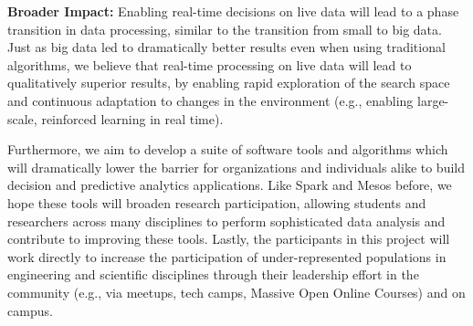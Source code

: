 \documentclass [10pt]{article}
\begin{document}
{%

{\bf Broader Impact:} Enabling real-time decisions on live data will lead to a phase transition in data processing, similar to the transition from small to big data. Just as big data led to dramatically better results even when using traditional algorithms, 
we believe that real-time processing on live data will lead to qualitatively superior results, by enabling rapid exploration of the search space and continuous adaptation to changes in the environment (e.g., enabling large-scale, reinforced learning in real time).

Furthermore, we aim to develop a suite of software tools and algorithms which will dramatically lower the barrier for organizations and individuals alike to build decision and predictive analytics applications. Like Spark and Mesos before, we hope these tools will broaden research participation, allowing students and researchers across many disciplines to perform sophisticated data analysis and contribute to improving these tools. Lastly, the participants in this project will work directly to increase the participation of under-represented populations in engineering and scientific disciplines through their leadership effort in the community (e.g., via meetups, tech camps, Massive Open Online Courses) and on campus.


}
\newpage

\setcounter{section}{0}


\newpage
\pagestyle{plain}
\setcounter{page}{1}
\end{document}
